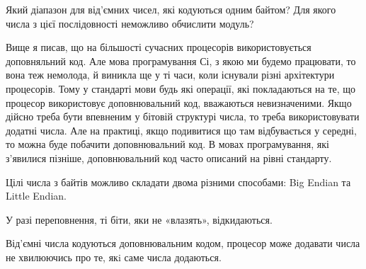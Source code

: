\documentclass{book}
\begin{document}
\begin{exercise}
Який діапазон для від'ємних чисел, які кодуються одним байтом? Для якого числа з цієї послідовності неможливо обчислити модуль?
\end{exercise}

\medskip

Вище я писав, що на більшості сучасних процесорів використовується доповняльний код.
Але мова програмування Сі, з якою ми будемо працювати, то вона теж немолода, й виникла ще у ті часи, коли існували різні архітектури процесорів.
Тому у стандарті мови будь які операції, які покладаються на те, що процесор використовує доповнювальний код, вважаються невизначеними.
Якщо дійсно треба бути впевненим у бітовій структурі числа, то треба використовувати додатні числа.
Але на практиці, якщо подивитися що там відбувається у середні, то можна буде побачити доповнювальний код.
В мовах програмування, які з'явилися пізніше, доповнювальний код часто описаний на рівні стандарту.

\begin{summary}
\item Цілі числа з байтів можливо складати двома різними способами: Big Endian та Little Endian.
\item У разі переповнення, ті біти, яки не «влазять», відкидаються.
\item Від'ємні числа кодуються доповнювальним кодом, процесор може додавати числа не хвилюючись про те, якi саме числа додаються.
\end{summary}

\printindex
\end{document}

